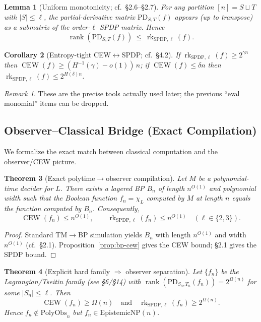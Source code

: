\documentclass[12pt]{article}
\newtheorem{theorem}{Theorem}
\newtheorem{lemma}[theorem]{Lemma}
\newtheorem{corollary}[theorem]{Corollary}
\theoremstyle{definition}
\theoremstyle{definition}
\theoremstyle{remark}
\newtheorem{remark}{Remark}
\theoremstyle{remark}
\begin{document}
\begin{lemma}[Uniform monotonicity; cf.\ \S2.6--\S2.7]\label{lem:uniform-monotonicity-ref}
For any partition $[n]=S\sqcup T$ with $|S|\le\ell$, the partial-derivative matrix $\mathrm{PD}_{S,T}(f)$ appears (up to transpose) as a submatrix of the order-$\ell$ SPDP matrix. Hence
\[
\operatorname{rank}(\mathrm{PD}_{S,T}(f)) \ \le\ \operatorname{rk}_{\mathrm{SPDP},\ell}(f).
\]
\end{lemma}

\begin{corollary}[Entropy-tight CEW$\leftrightarrow$SPDP; cf.\ \S4.2]\label{cor:entropy-tight-ref}
If $\operatorname{rk}_{\mathrm{SPDP},\ell}(f)\ge 2^{\gamma n}$ then $\operatorname{CEW}(f)\ge(H^{-1}(\gamma)-o(1))\,n$; if $\operatorname{CEW}(f)\le\delta n$ then $\operatorname{rk}_{\mathrm{SPDP},\ell}(f)\le 2^{H(\delta)n}$.
\end{corollary}

\begin{remark}
These are the precise tools actually used later; the previous ``eval monomial'' items can be dropped.
\end{remark}

\subsection{Observer--Classical Bridge (Exact Compilation)}

We formalize the exact match between classical computation and the observer/CEW picture.

\begin{theorem}[Exact polytime$\to$observer compilation]\label{thm:exact-compilation}
Let $M$ be a polynomial-time decider for $L$. There exists a layered BP $B_n$ of length $n^{O(1)}$ and polynomial width such that the Boolean function $f_n=\chi_L$ computed by $M$ at length $n$ equals the function computed by $B_n$. Consequently,
\[
\operatorname{CEW}(f_n)\le n^{O(1)},\qquad \operatorname{rk}_{\mathrm{SPDP},\ell}(f_n)\le n^{O(1)} \quad(\ell\in\{2,3\}).
\]
\end{theorem}

\begin{proof}
Standard TM$\to$BP simulation yields $B_n$ with length $n^{O(1)}$ and width $n^{O(1)}$ (cf.\ \S2.1). Proposition~\ref{prop:bp-cew} gives the CEW bound; \S2.1 gives the SPDP bound.
\end{proof}

\begin{theorem}[Explicit hard family $\Rightarrow$ observer separation]\label{thm:hard-implies-separation}
Let $\{f_n\}$ be the Lagrangian/Tseitin family (see \S6/\S14) with $\operatorname{rank}(\mathrm{PD}_{S_n,T_n}(f_n))=2^{\Omega(n)}$ for some $|S_n|\le\ell$. Then
\[
\operatorname{CEW}(f_n)\ge\Omega(n) \quad\text{and}\quad \operatorname{rk}_{\mathrm{SPDP},\ell}(f_n)\ge 2^{\Omega(n)}.
\]
Hence $f_n\notin\mathrm{PolyObs}_n$ but $f_n\in\mathrm{EpistemicNP}(n)$.
\end{theorem}
\end{document}
